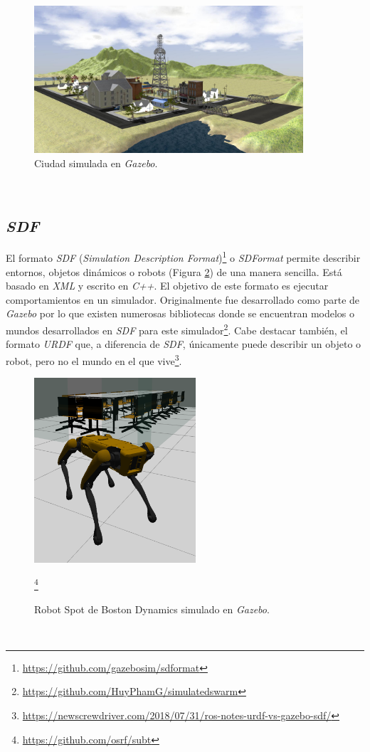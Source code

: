 \begin{figure} [h!]
	\begin{center}
		\includegraphics[width=10cm]{figs/city}
	\end{center}
	\caption{Ciudad simulada en \textit{Gazebo}.}
	\label{fig:city}
\end{figure}\

\subsection{\textit{SDF}}
\label{subsection:sdf}
El formato \textit{SDF} (\textit{Simulation Description Format})\footnote{\url{https://github.com/gazebosim/sdformat}} o \textit{SDFormat} permite describir entornos, objetos dinámicos o robots (Figura \ref{fig:spot}) de una manera sencilla. Está basado en \textit{XML} y escrito en \textit{C++}. El objetivo de este formato es ejecutar comportamientos en un simulador. Originalmente fue desarrollado como parte de \textit{Gazebo} por lo que existen numerosas bibliotecas donde se encuentran modelos o mundos desarrollados en \textit{SDF} para este simulador\footnote{\url{https://github.com/HuyPhamG/simulatedswarm}}. Cabe destacar también, el formato \textit{URDF} que, a diferencia de \textit{SDF}, únicamente puede describir un objeto o robot, pero no el mundo en el que vive\footnote{\url{https://newscrewdriver.com/2018/07/31/ros-notes-urdf-vs-gazebo-sdf/}}.\\

\begin{figure} [h!]
	\begin{center}
		\includegraphics[width=6cm]{figs/spot}
	\end{center}
	\caption{Robot Spot de Boston Dynamics simulado en \textit{Gazebo}.}\footnote{\url{https://github.com/osrf/subt}}
	\label{fig:spot}
\end{figure}\

